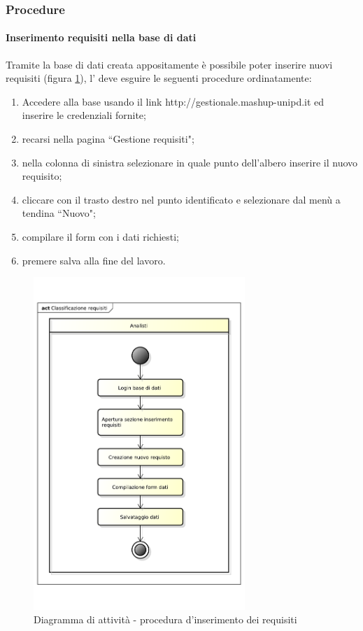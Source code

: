 		\subsubsection{Procedure}

			\paragraph{Inserimento requisiti nella base di dati}
			Tramite la base di dati creata appositamente è possibile poter inserire nuovi requisiti (figura \ref{fig:procedura_inserimento_requisiti}), l'\roleAnalyst{} deve esguire le seguenti procedure ordinatamente:

				\begin{enumerate}
			 		\item Accedere alla base usando il link http://gestionale.mashup-unipd.it ed inserire le credenziali fornite;
			 		\item recarsi nella pagina ``Gestione requisiti";
					\item nella colonna di sinistra selezionare in quale punto dell'albero inserire il nuovo requisito;
					\item cliccare con il trasto destro nel punto identificato e selezionare dal menù a tendina ``Nuovo";
					\item compilare il form con i dati richiesti;
					\item premere salva alla fine del lavoro.
			 	\end{enumerate}

			 	\begin{figure}
					\centering
					\includegraphics[width=8cm]{images/classificazione_requisiti.pdf}
					\caption{Diagramma di attività - procedura d'inserimento dei requisiti}
					\label{fig:procedura_inserimento_requisiti}
				\end{figure}

